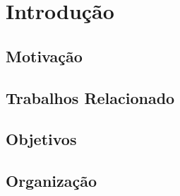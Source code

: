 \chapter{Introdução}



\section{Motivação}



\section{Trabalhos Relacionado}

\section{Objetivos}

\section{Organização}


